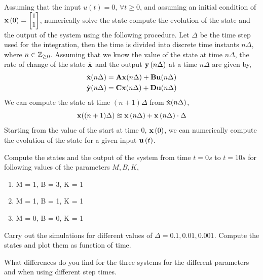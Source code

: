 \documentclass[9pt]{article}
\def\mf{\ensuremath\mathbf}
\def\mb{\ensuremath\mathbb}
\def\lp{\ensuremath\left(}
\def\rp{\ensuremath\right)}
\def\bmx{\ensuremath\begin{bmatrix*}[r]}
\def\emx{\ensuremath\end{bmatrix*}}
\begin{document}
\begin{multicols}{2}
\begin{enumerate}[resume]
    Assuming that the input $u(t) = 0$, $\forall t \geq 0$, and assuming an initial condition of $\mf{x}\lp 0 \rp = \bmx 1 \\ 1\emx$, numerically solve the state compute the evolution of the state and the output of the system using the following procedure. Let $\Delta$ be the time step used for the integration, then the time is divided into discrete time instants $n \Delta$, where $n \in \mb{Z}_{\geq 0}$. Assuming that we know the value of the state at time $n\Delta$, the rate of change of the state $\dot{\mf{x}}$ and the output $\mf{y}\lp n\Delta \rp$ at a time $n \Delta$ are given by,
    \[ \begin{split}
        \dot{\mf{x}}( n \Delta ) &= \mf{A} \mf{x}(n \Delta) + \mf{B}\mf{u}(n \Delta) \\
        \dot{\mf{y}}( n \Delta ) &= \mf{C} \mf{x}(n \Delta) + \mf{D}\mf{u}(n \Delta)
        \end{split} \]
    We can compute the state at time $(n+1)\Delta$ from $\dot{\mf{x}}(n \Delta)$,
    \[ \mf{x}((n+1)\Delta) \approxeq \mf{x}\lp n\Delta\rp + \mf{x}\lp n\Delta \rp \cdot \Delta \]
    Starting from the value of the start at time $0$, $\mf{x}\lp 0 \rp$, we can numerically compute the evolution of the state for a given input $\mf{u}\lp t \rp$.

    Compute the states and the output of the system from time $t = 0 s$ to $t = 10s$ for following values of the parameters $M, B, K$,
    \begin{enumerate}
        \item M = 1, B = 3, K = 1
        \item M = 1, B = 1, K = 1
        \item M = 0, B = 0, K = 1
    \end{enumerate}

    Carry out the simulations for different values of $\Delta = 0.1, 0.01, 0.001$. Compute the states and plot them as function of time. 

    What differences do you find for the three systems for the different parameters and when using different step times.

\end{enumerate}

\end{multicols}
\end{document}
